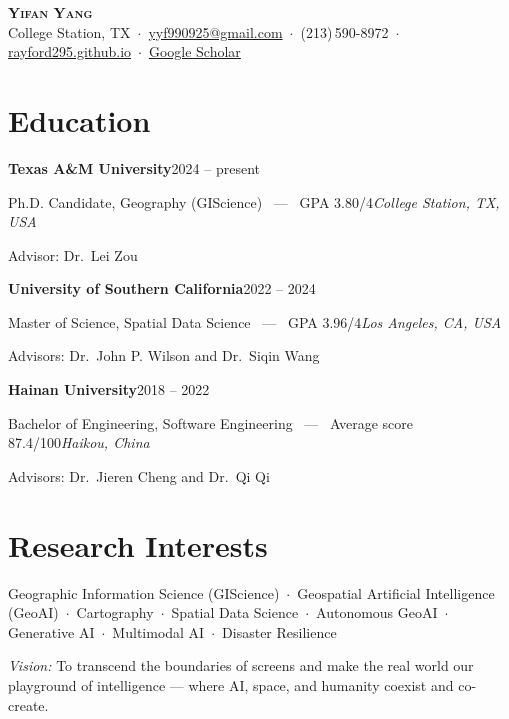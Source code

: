 \documentclass[10pt,letterpaper]{article}
\newcommand{\entry}[2]{%
  \par\vspace{0.30em}\noindent\textbf{#1}\hfill{\small #2}\par}
\newcommand{\subentry}[2]{%
  \par\nobreak\vspace{0.05em}\noindent #1\hfill{\small\itshape #2}\par}
\begin{document}

\begin{center}
  {\LARGE\bfseries\scshape Yifan Yang}\\[0.45em]
  {\small
   College Station, TX \,$\cdot$\,
   \href{mailto:yyf990925@gmail.com}{yyf990925@gmail.com} \,$\cdot$\,
   (213)\,590-8972 \,$\cdot$\,
   \href{https://rayford295.github.io/}{rayford295.github.io} \,$\cdot$\,
   \href{https://scholar.google.com/citations?user=B-fiSHwAAAAJ}{Google Scholar}}
\end{center}
\vspace{0.35em}

\section{Education}

\entry{Texas A\&M University}{2024 -- present}
\subentry{Ph.D. Candidate, Geography (GIScience) \, --- \, GPA 3.80/4}{College Station, TX, USA}
\subentry{Advisor: Dr.~Lei Zou}{}

\entry{University of Southern California}{2022 -- 2024}
\subentry{Master of Science, Spatial Data Science \, --- \, GPA 3.96/4}{Los Angeles, CA, USA}
\subentry{Advisors: Dr.~John P. Wilson and Dr.~Siqin Wang}{}

\entry{Hainan University}{2018 -- 2022}
\subentry{Bachelor of Engineering, Software Engineering \, --- \, Average score 87.4/100}{Haikou, China}
\subentry{Advisors: Dr.~Jieren Cheng and Dr.~Qi Qi}{}

\section{Research Interests}

Geographic Information Science (GIScience) \,$\cdot$\, Geospatial Artificial Intelligence (GeoAI) \,$\cdot$\, Cartography \,$\cdot$\, Spatial Data Science \,$\cdot$\, Autonomous GeoAI \,$\cdot$\, Generative AI \,$\cdot$\, Multimodal AI \,$\cdot$\, Disaster Resilience

\vspace{0.5em}
\textit{Vision:} To transcend the boundaries of screens and make the real world our playground of intelligence --- where AI, space, and humanity coexist and co-create.
\end{document}
